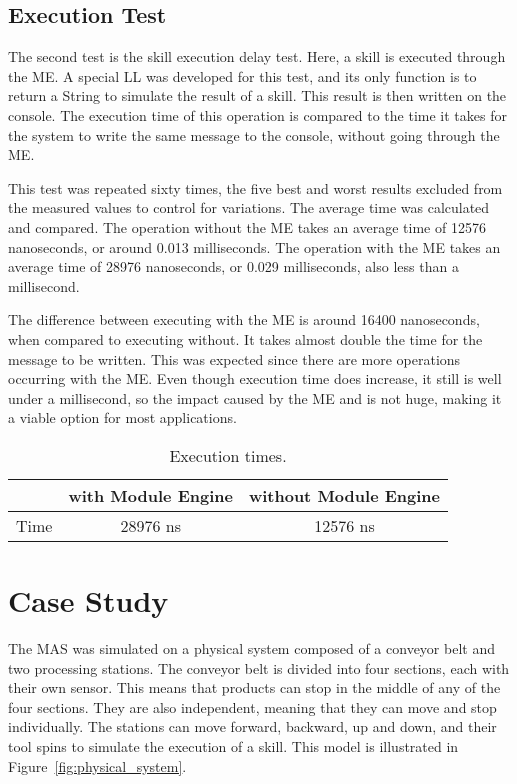 \subsection{Execution Test}

The second test is the skill execution delay test. Here, a skill is executed through the \acrlong{ME}. A special \acrlong{LL} was developed for this test, and its only function is to return a String to simulate the result of a skill. This result is then written on the console. The execution time of this operation is compared to the time it takes for the system to write the same message to the console, without going through the \acrshort{ME}. 

This test was repeated sixty times, the five best and worst results excluded from the measured values to control for variations. The average time was calculated and compared. The operation without the \acrshort{ME} takes an average time of 12576 nanoseconds, or around 0.013 milliseconds. The operation with the \acrshort{ME} takes an average time of 28976 nanoseconds, or 0.029 milliseconds, also less than a millisecond. 

The difference between executing with the \acrshort{ME} is around 16400 nanoseconds, when compared to executing without. It takes almost double the time for the message to be written. This was expected since there are more operations occurring with the \acrshort{ME}. Even though execution time does increase, it still is well under a millisecond, so the impact caused by the \acrlong{ME} and  is not huge, making it a viable option for most applications.

\begin{table}[h!]
	\centering
	\caption{Execution times.}
	\begin{tabular}{l|c|c|}
		\cline{2-3}
									& with Module Engine & without Module Engine \\ \hline
		\multicolumn{1}{|l|}{Time} 	& 28976 ns           & 12576 ns              \\ \hline
	\end{tabular}
	\label{tab:execution_times}
\end{table}

\section{Case Study}

The \acrshort{MAS} was simulated on a physical system composed of a conveyor belt and two processing stations. The conveyor belt is divided into four sections, each with their own sensor. This means that products can stop in the middle of any of the four sections. They are also independent, meaning that they can move and stop individually. The stations can move forward, backward, up and down, and their tool spins to simulate the execution of a skill. This model is illustrated in Figure~\ref{fig:physical_system}.

